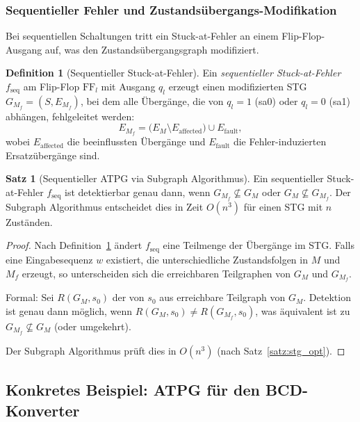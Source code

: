 ﻿\documentclass[a4paper,12pt]{article}
\theoremstyle{definition}
\newtheorem{definition}{Definition}
\newtheorem{satz}{Satz}
\begin{document}
\subsubsection{Sequentieller Fehler und Zustandsübergangs-Modifikation}

Bei sequentiellen Schaltungen tritt ein Stuck-at-Fehler an einem Flip-Flop-Ausgang auf,
was den Zustandsübergangsgraph modifiziert.

\begin{definition}[Sequentieller Stuck-at-Fehler]\label{def:seqstuckat}
  Ein \emph{sequentieller Stuck-at-Fehler} $f_{\text{seq}}$ am Flip-Flop $\text{FF}_l$
  mit Ausgang $q_l$ erzeugt einen modifizierten STG $G_{M_f} = (S, E_{M_f})$, bei dem
  alle Übergänge, die von $q_l = 1$ (sa0) oder $q_l = 0$ (sa1) abhängen, fehlgeleitet
  werden:
  \[
    E_{M_f} = \bigl(E_M \setminus E_{\text{affected}}\bigr) \cup E_{\text{fault}},
  \]
  wobei $E_{\text{affected}}$ die beeinflussten Übergänge und $E_{\text{fault}}$ die
  Fehler-induzierten Ersatzübergänge sind.
\end{definition}

\begin{satz}[Sequentieller ATPG via Subgraph Algorithmus]\label{satz:seqatpg}
  Ein sequentieller Stuck-at-Fehler $f_{\text{seq}}$ ist detektierbar genau dann,
  wenn $G_{M_f} \not\subseteq G_M$ oder $G_M \not\subseteq G_{M_f}$. Der Subgraph
  Algorithmus entscheidet dies in Zeit $O(n^3)$ für einen STG mit $n$ Zuständen.
\end{satz}

\begin{proof}
  Nach Definition~\ref{def:seqstuckat} ändert $f_{\text{seq}}$ eine Teilmenge der
  Übergänge im STG. Falls eine Eingabesequenz $w$ existiert, die unterschiedliche
  Zustandsfolgen in $M$ und $M_f$ erzeugt, so unterscheiden sich die erreichbaren
  Teilgraphen von $G_M$ und $G_{M_f}$.

  Formal: Sei $R(G_M, s_0)$ der von $s_0$ aus erreichbare Teilgraph von $G_M$.
  Detektion ist genau dann möglich, wenn $R(G_M, s_0) \neq R(G_{M_f}, s_0)$, was
  äquivalent ist zu $G_{M_f} \not\subseteq G_M$ (oder umgekehrt).

  Der Subgraph Algorithmus prüft dies in $O(n^3)$ (nach Satz~\ref{satz:stg_opt}).
\end{proof}

\subsection{Konkretes Beispiel: ATPG für den BCD-Konverter}
\end{document}
